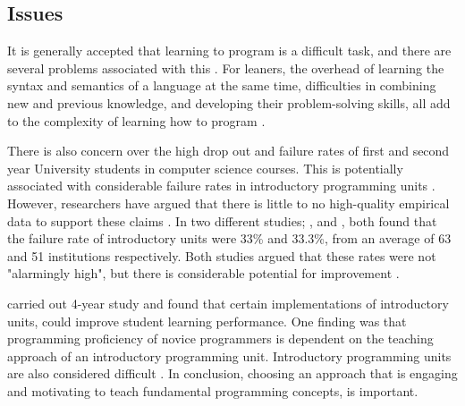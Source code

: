 \documentclass[a4paper,11.5pt]{report}
\numberwithin{figure}{section}
\numberwithin{table}{section}
\numberwithin{equation}{section}
\numberwithin{equation}{section}
\begin{document}


\subsection{Issues}


It is generally accepted that learning to program is a difficult task, and there are several problems associated with this \citep{Koulouri2014}. For leaners, the overhead of learning the syntax and semantics of a language at the same time, difficulties in combining new and previous knowledge, and developing their problem-solving skills, all add to the complexity of learning how to program \citep{Koulouri2014}.

There is also concern over the high drop out and failure rates of first and second year University students in computer science courses. This is potentially associated with considerable failure rates in introductory programming units \citep{Koulouri2014}. However, researchers have argued that there is little to no high-quality empirical data to support these claims \citep{bennedsen2007, watson2014}. In two different studies; \citet{bennedsen2007}, and \citet{watson2014}, both found that the failure rate of introductory units were 33\% and 33.3\%, from an average of 63 and 51 institutions respectively. Both studies argued that these rates were not "alarmingly high", but there is considerable potential for improvement \citep{watson2014}.

\citet{Koulouri2014} carried out 4-year study and found that certain implementations of introductory units, could improve student learning performance. One finding was that programming proficiency of novice programmers is dependent on the teaching approach of an introductory programming unit. Introductory programming units are also considered difficult \citep{watson2014}. In conclusion, choosing an approach that is engaging and motivating to teach fundamental programming concepts, is important.
\end{document}
